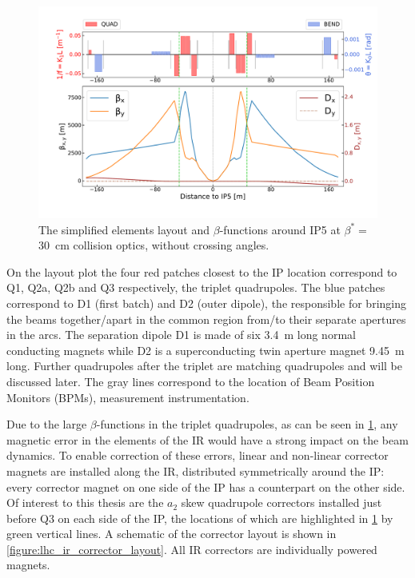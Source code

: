\begin{figure}[!hbt]
  \centering
  \includegraphics*[width=0.99\linewidth]{Figures/Optics_Measurements_Corrections_at_LHC/lhc_ir5_zoomed.pdf}
  \caption{The simplified elements layout and \(\beta\)-functions around IP\num{5} at \(\beta^{\ast} =\) \qty{30}{\centi\metre} collision optics, without crossing angles.}
  \label{figure:lhc_ir5_zoomed}
\end{figure}

On the layout plot the four \textcolor{latwiss_red}{red patches} closest to the IP location correspond to Q\num{1}, Q\num{2}a, Q\num{2}b and Q\num{3} respectively, the triplet quadrupoles.
The \textcolor{latwiss_blue}{blue patches} correspond to D\num{1} (first batch) and D\num{2} (outer dipole), the  responsible for bringing the beams together/apart in the common region from/to their separate apertures in the arcs.
The separation dipole D\num{1} is made of six \qty{3.4}{\meter} long normal conducting magnets while D\num{2} is a superconducting twin aperture magnet \qty{9.45}{\meter} long.
Further quadrupoles after the triplet are matching quadrupoles and will be discussed later.
The gray lines correspond to the location of Beam Position Monitors (BPMs), measurement instrumentation.

Due to the large \(\beta\)-functions in the triplet quadrupoles, as can be seen in \cref{figure:lhc_ir5_zoomed}, any magnetic error in the elements of the IR would have a strong impact on the beam dynamics.
To enable correction of these errors, linear and non-linear corrector magnets are installed along the IR, distributed symmetrically around the IP: every corrector magnet on one side of the IP has a counterpart on the other side.
Of interest to this thesis are the \(a_2\) skew quadrupole correctors installed just before Q\num{3} on each side of the IP, the locations of which are highlighted in \cref{figure:lhc_ir5_zoomed} by \textcolor{mqsx_green}{green vertical lines}.
A schematic of the corrector layout is shown in \cref{figure:lhc_ir_corrector_layout}.
All IR correctors are individually powered magnets.

